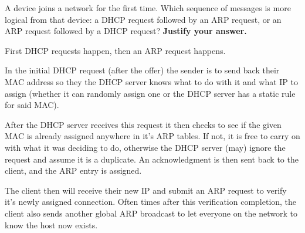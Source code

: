 \documentclass[12pt,addpoints,answers]{exam}
\begin{document}
\begin{questions}
\begin{solution}[3in]
\end{solution}
\newpage
\question[10] A device joins a network for the first time. Which sequence of messages is more logical from that device: a DHCP request followed by an ARP request, or an ARP request followed by a DHCP request? \textbf{Justify your answer.}
\begin{solution}[3in]
	First DHCP requests happen, then an ARP request happens.
	
	In the initial DHCP request (after the offer) the sender is to send back their MAC address so they the DHCP server knows what to do with it and what IP to assign (whether it can randomly assign one or the DHCP server has a static rule for said MAC).
	
	After the DHCP server receives this request it then checks to see if the given MAC is already assigned anywhere in it's ARP tables.  If not, it is free to carry on with what it was deciding to do, otherwise the DHCP server (may) ignore the request and assume it is a duplicate.  An acknowledgment is then sent back to the client, and the ARP entry is assigned.
	
	The client then will receive their new IP and submit an ARP request to verify it's newly assigned connection.  Often times after this verification completion, the client also sends another global ARP broadcast to let everyone on the network to know the host now exists. 
\end{solution}



\end{questions}
\end{document}
